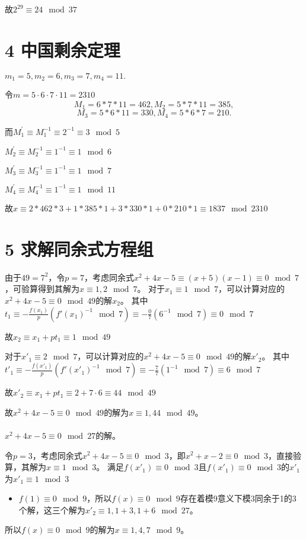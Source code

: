 \documentclass{article}
\begin{document}
故$2^{29}\equiv 24\mod 37$

\section*{4 中国剩余定理}
$m_1=5,m_2=6,m_3=7,m_4=11.$

令$m=5\cdot 6\cdot 7\cdot 11=2310$
\[M_1 = 6*7*11=462,M_2=5*7*11=385,\]
\[M_3 = 5*6*11=330,M_4=5*6*7=210.\]

而$M_1^{'}\equiv M_1^{-1} \equiv 2^{-1}\equiv 3\mod 5$

$M_2^{'}\equiv M_2^{-1} \equiv 1^{-1}\equiv 1\mod 6$

$M_3^{'}\equiv M_3^{-1} \equiv 1^{-1}\equiv 1\mod 7$

$M_4^{'}\equiv M_4^{-1} \equiv 1^{-1}\equiv 1\mod 11$

故$x\equiv 2*462*3+1*385*1+3*330*1+0*210*1 \equiv 1837 \mod 2310$

\section*{5 求解同余式方程组}
由于$49=7^2$，令$p=7$，考虑同余式$x^2+4x-5\equiv (x+5)(x-1) \equiv 0 \mod 7$，可验算得到其解为$x\equiv 1,2 \mod7$。
对于$x_1\equiv 1 \mod 7$，可以计算对应的$x^2+4x-5\equiv 0 \mod 49$的解$x_2$。
其中$t_1\equiv - \frac{f(x_{1})}{p}(f'(x_1)^{-1}\mod 7)\equiv - \frac{0}{7}(6^{-1}\mod 7) \equiv 0\mod 7$

故$x_2\equiv x_1+pt_1 \equiv 1 \mod 49$

对于$x'_1\equiv 2 \mod 7$，可以计算对应的$x^2+4x-5\equiv 0 \mod 49$的解$x'_2$。
其中$t'_1\equiv - \frac{f(x'_{1})}{p}(f'(x'_1)^{-1}\mod 7)\equiv - \frac{7}{7}(1^{-1}\mod 7) \equiv 6\mod 7$

故$x'_2\equiv x_1+pt_1 \equiv 2+7\cdot6 \equiv 44 \mod 49$

故$x^2+4x-5 \equiv 0 \mod 49$的解为$x\equiv 1,44\mod 49$。\\\\

$x^2+4x-5\equiv 0 \mod 27$的解。

令$p=3$，考虑同余式$x^2+4x-5 \equiv 0\mod 3$，即$x^2+x-2 \equiv 0 \mod 3$，直接验算，其解为$x\equiv 1 \mod 3$。
满足$f(x'_1) \equiv 0 \mod 3$且$f(x'_1)\equiv 0 \mod 3$的$x'_1$为$x'_1\equiv 1 \mod 3$
\begin{itemize}
\item
	$f(1)\equiv 0 \mod 9$，所以$f(x) \equiv 0 \mod 9 $存在着模9意义下模3同余于1的3个解，这三个解为$x'_2 \equiv 1,1+3,1+6 \mod 27$。
\end{itemize}
所以$f(x) \equiv 0 \mod 9$的解为$x\equiv 1,4,7 \mod 9$。\\
\end{document}
